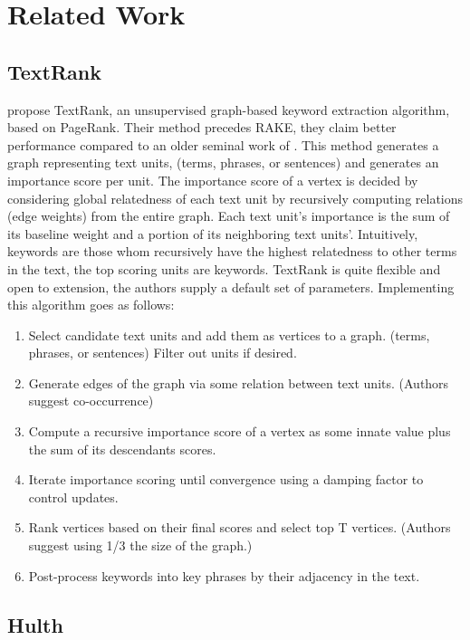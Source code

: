 \documentclass[11pt,a4paper]{article}
\begin{document}
\section{Related Work}

\subsection{TextRank}

\citet{4} propose TextRank, an unsupervised graph-based keyword extraction algorithm, based on PageRank. Their method precedes RAKE, they claim better performance compared to an older seminal work of \citet{hulth-2003-improved}. This method generates a graph representing text units, (terms, phrases, or sentences) and generates an importance score per unit. The importance score of a vertex is decided by considering global relatedness of each text unit by recursively computing relations (edge weights) from the entire graph. Each text unit's importance is the sum of its baseline weight and a portion of its neighboring text units'. Intuitively, keywords are those whom recursively have the highest relatedness to other terms in the text, the top scoring units are keywords. TextRank is quite flexible and open to extension, the authors supply a default set of parameters. Implementing this algorithm goes as follows:

\begin{enumerate}
\small \itemsep0em 

\item Select candidate text units and add them as vertices to a graph. (terms, phrases, or sentences) Filter out units if desired. 
\item Generate edges of the graph via some relation between text units. (Authors suggest co-occurrence)
\item Compute a recursive importance score of a vertex as some innate value plus the sum of its descendants scores.    
\item Iterate importance scoring until convergence using a damping factor to control updates.
\item Rank vertices based on their final scores and select top T vertices. (Authors suggest using 1/3 the size of the graph.)
\item Post-process keywords into key phrases by their adjacency in the text.

\normalsize
\end{enumerate}   

\subsection{Hulth}
\end{document}
